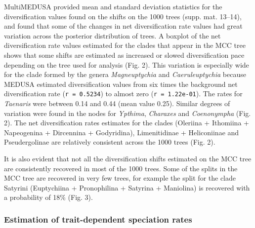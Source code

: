 \documentclass[]{article}
\begin{document}
MultiMEDUSA provided mean and standard deviation statistics for the
diversification values found on the shifts on the 1000 trees (supp. mat.
13--14), and found that some of the changes in net diversification rate
values had great variation across the posterior distribution of trees. A
boxplot of the net diversification rate values estimated for the clades
that appear in the MCC tree shows that some shifts are estimated as
increased or slowed diversification pace depending on the tree used for
analysis (Fig. 2). This variation is especially wide for the clade
formed by the genera \emph{Magneuptychia} and \emph{Caeruleuptychia}
because MEDUSA estimated diversification values from six times the
background net diversification rate (\texttt{r = 0.5234}) to almost zero
(\texttt{r = 1.22e-01}). The rates for \emph{Taenaris} were between 0.14
and 0.44 (mean value 0.25). Similar degrees of variation were found in
the nodes for \emph{Ypthima}, \emph{Charaxes} and \emph{Coenonympha}
(Fig. 2). The net diversification rates estimates for the clades
(Oleriina + Ithomiina + Napeogenina + Dircennina + Godyridina),
Limenitidinae + Heliconiinae and Pseudergolinae are relatively
consistent across the 1000 trees (Fig. 2).

It is also evident that not all the diversification shifts estimated on
the MCC tree are consistently recovered in most of the 1000 trees. Some
of the splits in the MCC tree are recovered in very few trees, for
example the split for the clade Satyrini (Euptychiina + Pronophilina +
Satyrina + Maniolina) is recovered with a probability of 18\% (Fig. 3).

\subsubsection{Estimation of trait-dependent speciation
rates}\label{estimation-of-trait-dependent-speciation-rates-1}
\end{document}
